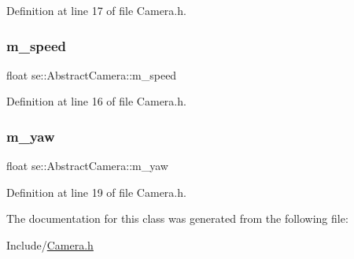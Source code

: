 Definition at line 17 of file Camera.\+h.

\mbox{\label{classse_1_1_abstract_camera_a4689e12e2d96c8243ea8790301ed30a7}} 
\subsubsection{\texorpdfstring{m\+\_\+speed}{m\_speed}}
{\footnotesize\ttfamily float se\+::\+Abstract\+Camera\+::m\+\_\+speed\hspace{0.3cm}{\ttfamily [protected]}}



Definition at line 16 of file Camera.\+h.

\mbox{\label{classse_1_1_abstract_camera_ae3b2898fd2db420ac4329c13e96a98db}} 
\subsubsection{\texorpdfstring{m\+\_\+yaw}{m\_yaw}}
{\footnotesize\ttfamily float se\+::\+Abstract\+Camera\+::m\+\_\+yaw\hspace{0.3cm}{\ttfamily [protected]}}



Definition at line 19 of file Camera.\+h.



The documentation for this class was generated from the following file\+:\begin{DoxyCompactItemize}
\item 
Include/\mbox{\hyperlink{_camera_8h}{Camera.\+h}}\end{DoxyCompactItemize}

